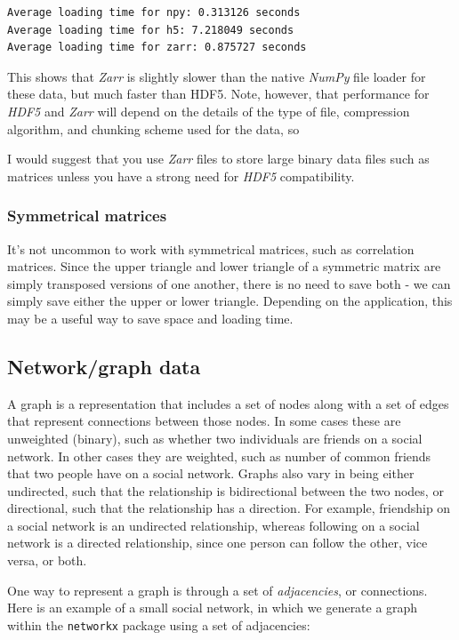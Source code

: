 \begin{lstlisting}[style=shellshort]
Average loading time for npy: 0.313126 seconds
Average loading time for h5: 7.218049 seconds
Average loading time for zarr: 0.875727 seconds
\end{lstlisting}

This shows that \textit{Zarr} is slightly slower than the native \textit{NumPy} file loader for these data, but much faster than HDF5.  Note, however, that performance for \textit{HDF5} and \textit{Zarr} will depend on the details of the type of file, compression algorithm, and chunking scheme used for the data, so 

I would suggest that you use \textit{Zarr} files to store large binary data files such as matrices unless you have a strong need for \textit{HDF5} compatibility.

\subsubsection{Symmetrical matrices}

It's not uncommon to work with symmetrical matrices, such as correlation matrices.  Since the upper triangle and lower triangle of a symmetric matrix are simply transposed versions of one another, there is no need to save both - we can simply save either the upper or lower triangle.  Depending on the application, this may be a useful way to save space and loading time.

\subsection{Network/graph data}

A graph is a representation that includes a set of nodes along with a set of edges that represent connections between those nodes. In some cases these are unweighted (binary), such as whether two individuals are friends on a social network.  In other cases they are weighted, such as number of common friends that two people have on a social network.  Graphs also vary in being either undirected, such that the relationship is bidirectional between the two nodes, or directional, such that the relationship has a direction.  For example, friendship on a social network is an undirected relationship, whereas following on a social network is a directed relationship, since one person can follow the other, vice versa, or both.

One way to represent a graph is through a set of \textit{adjacencies}, or connections.  Here is an example of a small social network, in which we generate a graph within the \texttt{networkx} package using a set of adjacencies:

